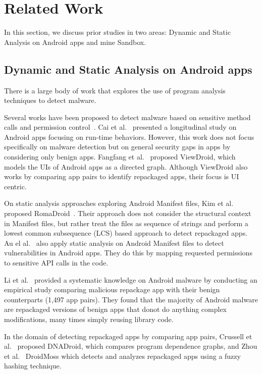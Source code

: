 \section{Related Work}\label{sec:relatedwork}
In this section, we discuss prior studies in two areas: Dynamic and Static Analysis on Android apps and mine Sandbox.

\subsection{Dynamic and Static Analysis on Android apps}\label{sec:analysis}

There is a large body of work that explores the use of program analysis techniques to detect malware. 

Several works have been proposed to detect malware based on sensitive method calls and permission control~\cite{DBLP:conf/mobicom/WeiGNF12,DBLP:conf/asiajcis/WuMWLW12,DBLP:conf/sp/LiDLDG21}. Cai et al.~\cite{DBLP:journals/tse/CaiR21} presented a longitudinal study on Android apps focusing on run-time behaviors. However, this work does not focus specifically on malware detection but on general security gaps in apps by considering only benign apps. Fangfang et al.~\cite{DBLP:conf/wisec/ZhangHZW014} proposed ViewDroid, which models the UIs of Android apps as a directed graph. Although ViewDroid also works by comparing app pairs to identify repackaged apps, their focus is UI centric.

On static analysis approaches exploring Android Manifest files, Kim et al. proposed RomaDroid~\cite{DBLP:journals/access/KimLCP19}.  Their approach does not consider the structural context in Manifest files, but rather treat the files as sequence of strings and perform a lowest common subsequence (LCS) based approach to detect repackaged apps. Au el al.~\cite{DBLP:conf/ccs/AuZHL12} also apply static analysis on Android Manifest files to detect vulnerabilities in Android apps. They do this by mapping requested permissions to sensitive API calls in the code.

Li et al.~\cite{DBLP:journals/tifs/0029LBKTLC17} provided a systematic knowledge on Android malware by conducting an empirical study comparing malicious repackage app with their benign counterparts (1,497 app pairs). They found that the majority of Android malware are repackaged versions of benign apps that donot do anything complex modifications, many times simply reusing library code.

 In the domain of detecting repackaged apps by comparing app pairs, Crussell et al.~\cite{DBLP:conf/esorics/CrussellGC12} proposed  DNADroid, which compares program dependence graphs, and Zhou et al.~\cite{DBLP:conf/codaspy/ZhouZJN12} DroidMoss which detects and analyzes repackaged apps using a fuzzy hashing technique.

